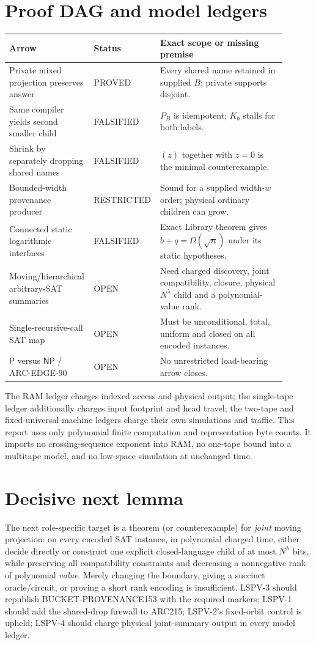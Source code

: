 \documentclass[11pt]{article}
\begin{document}
\section{Proof DAG and model ledgers}
\begin{center}
\begin{tabular}{p{0.27\linewidth}p{0.18\linewidth}p{0.45\linewidth}}
\toprule
Arrow & Status & Exact scope or missing premise\\\midrule
Private mixed projection preserves answer & PROVED & Every shared name retained in supplied $B$; private supports disjoint.\\
Same compiler yields second smaller child & FALSIFIED & $P_B$ is idempotent; $K_b$ stalls for both labels.\\
Shrink by separately dropping shared names & FALSIFIED & $(z)$ together with $z=0$ is the minimal counterexample.\\
Bounded-width provenance producer & RESTRICTED & Sound for a supplied width-$w$ order; physical ordinary children can grow.\\
Connected static logarithmic interfaces & FALSIFIED & Exact Library theorem gives $b+q=\Omega(\sqrt n)$ under its static hypotheses.\\
Moving/hierarchical arbitrary-SAT summaries & OPEN & Need charged discovery, joint compatibility, closure, physical $N^\lambda$ child and a polynomial-value rank.\\
Single-recursive-call SAT map & OPEN & Must be unconditional, total, uniform and closed on all encoded instances.\\
$\mathsf P$ versus $\mathsf{NP}$ / ARC-EDGE-90 & OPEN & No unrestricted load-bearing arrow closes.\\
\bottomrule
\end{tabular}
\end{center}

The RAM ledger charges indexed access and physical output; the single-tape ledger additionally charges input footprint and head travel; the two-tape and fixed-universal-machine ledgers charge their own simulations and traffic.  This report uses only polynomial finite computation and representation byte counts.  It imports no crossing-sequence exponent into RAM, no one-tape bound into a multitape model, and no low-space simulation at unchanged time.

\section{Decisive next lemma}
The next role-specific target is a theorem (or counterexample) for \emph{joint} moving projection: on every encoded SAT instance, in polynomial charged time, either decide directly or construct one explicit closed-language child of at most $N^\lambda$ bits, while preserving all compatibility constraints and decreasing a nonnegative rank of polynomial \emph{value}.  Merely changing the boundary, giving a succinct oracle/circuit, or proving a short rank encoding is insufficient.  LSPV-3 should republish BUCKET-PROVENANCE153 with the required markers; LSPV-1 should add the shared-drop firewall to ARC215; LSPV-2's fixed-orbit control is upheld; LSPV-4 should charge physical joint-summary output in every model ledger.
\end{document}
